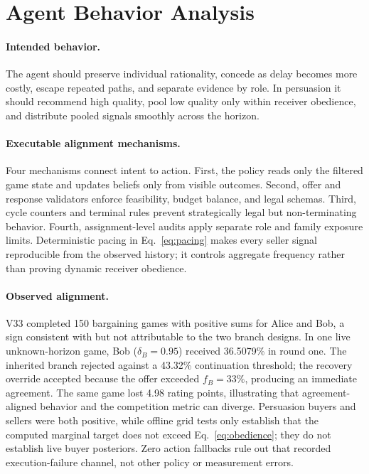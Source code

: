 \section{Agent Behavior Analysis}
\label{sec:behavior}

\paragraph{Intended behavior.}
The agent should preserve individual rationality, concede as delay becomes more
costly, escape repeated paths, and separate evidence by role. In persuasion it
should recommend high quality, pool low quality only within receiver obedience,
and distribute pooled signals smoothly across the horizon.

\paragraph{Executable alignment mechanisms.}
Four mechanisms connect intent to action. First, the policy reads only the
filtered game state and updates beliefs only from visible outcomes. Second,
offer and response validators enforce feasibility, budget balance, and legal
schemas. Third, cycle counters and terminal rules prevent strategically legal
but non-terminating behavior. Fourth, assignment-level audits apply separate
role and family exposure limits. Deterministic pacing in Eq.~\ref{eq:pacing}
makes every seller signal reproducible from the observed history; it controls
aggregate frequency rather than proving dynamic receiver obedience.

\paragraph{Observed alignment.}
V33 completed 150 bargaining games with positive sums for Alice and Bob, a sign
consistent with but not attributable to the two branch designs. In one live
unknown-horizon game, Bob ($\delta_B=0.95$) received 36.5079\% in round one.
The inherited branch rejected against a 43.32\% continuation threshold; the
recovery override accepted because the offer exceeded $f_B=33\%$, producing an
immediate agreement. The same game lost 4.98 rating points, illustrating that
agreement-aligned behavior and the competition metric can diverge. Persuasion
buyers and sellers were both positive, while offline grid tests only establish
that the computed marginal target does not exceed Eq.~\ref{eq:obedience}; they
do not establish live buyer posteriors. Zero action fallbacks rule out that
recorded execution-failure channel, not other policy or measurement errors.

